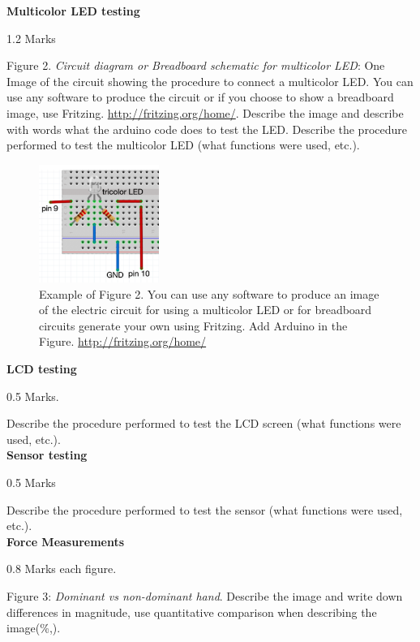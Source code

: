\documentclass[journal]{IEEEtran}
\begin{document}
{\bf Multicolor LED testing}  
\begin{flushright} 1.2 Marks \end{flushright}
Figure 2. {\it Circuit diagram or Breadboard schematic for multicolor LED}: One Image of the circuit showing the procedure to connect a multicolor LED. You can use any software to produce the circuit or if you choose to show a breadboard image, use Fritzing.
\href{http://fritzing.org/home/}{http://fritzing.org/home/}. 
Describe the image and describe with words what the arduino code does to test the LED.
 Describe the procedure performed to test the multicolor LED (what functions were used, etc.).

\begin{figure}[H]%
\begin {center}
\includegraphics[width=0.35\textwidth]{images/led_fritz.png}
\caption{Example of Figure 2. You can use any software to produce an image of the electric circuit for using a multicolor LED or for breadboard circuits generate your own using Fritzing.  Add Arduino in the Figure.
\href{http://fritzing.org/home/}{http://fritzing.org/home/}}
\label{fig:led_Frit}
\end {center}
\end{figure}

{\bf LCD testing}  
\begin{flushright} 0.5 Marks. \end{flushright}
 Describe the procedure performed to test the LCD screen (what functions were used, etc.).\\[0.1in]

{\bf Sensor testing}  
\begin{flushright} 0.5 Marks \end{flushright}
 Describe the procedure performed to test the sensor (what functions were used, etc.).\\[0.1in]


{\bf Force Measurements} \begin{flushright} 0.8 Marks each figure. \end{flushright} 
Figure 3: {\it Dominant vs non-dominant hand}.
Describe the image and write down differences in magnitude, use quantitative comparison when describing the image(\%,). \\
\end{document}
